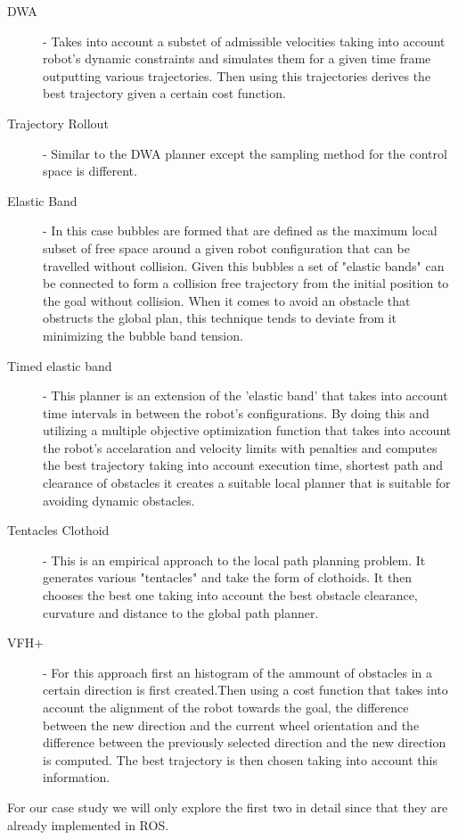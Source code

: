\begin{description}
    \item [\ac{DWA}] -  \cite{foxdwa} Takes into account a substet of admissible velocities taking into account robot's dynamic constraints and simulates them for a given time frame outputting various trajectories. Then using this trajectories derives the best trajectory given a certain cost function.  
    \item [Trajectory Rollout]  \cite{gerkey2008planning} - Similar to the \ac{DWA} planner except the sampling method for the control space is different.
    \item [Elastic Band] - \cite{siegwart2011introduction} In this case bubbles are formed that are defined as the maximum local subset of free space around a given robot configuration that can be travelled without collision.
    Given this bubbles a set of "elastic bands" can be connected to form a collision free trajectory from the initial position to the goal without collision. When it comes to avoid an obstacle that obstructs the global plan, this technique tends to deviate from it  minimizing the bubble band tension.
    \item [Timed elastic band] - \cite{rosmann2013efficient} This planner is an extension of the 'elastic band' that takes into account time intervals in between the robot's configurations. By doing this and utilizing a  multiple objective optimization function that takes into account the robot's accelaration and velocity limits with penalties and computes the best trajectory taking into account execution time, shortest path and clearance of obstacles it creates a suitable local planner that is suitable for avoiding dynamic obstacles.
    
    \item [Tentacles Clothoid] -  \cite{ffalia2015local} This is an empirical approach to the local path planning problem. It generates various "tentacles" and take the form of clothoids. It then chooses the best one taking into account the best obstacle clearance, curvature and distance to the global path planner. 
    
    \item [\ac{VFH}+] \cite{siegwart2011introduction} - For this approach first an histogram of the ammount of obstacles in a certain direction is first created.Then using a cost function that takes into account the alignment of the robot towards the goal, the difference between the new direction and the current wheel orientation and the difference between the previously selected direction and the new direction is computed. The best trajectory is then chosen taking into account this information.
    
\end{description}
For our case study we will only explore the first two in detail since that they are already implemented in ROS.
